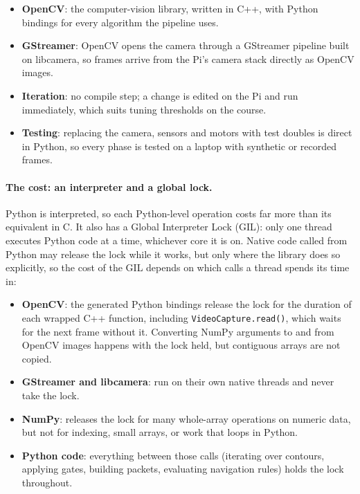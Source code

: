 \begin{itemize}
      \item \textbf{OpenCV}: the computer-vision library, written in C++, with
            Python bindings for every algorithm the pipeline uses.
      \item \textbf{GStreamer}: OpenCV opens the camera through a GStreamer
            pipeline built on libcamera, so frames arrive from the Pi's camera stack
            directly as OpenCV images.
      \item \textbf{Iteration}: no compile step; a change is edited on the Pi
            and run immediately, which suits tuning thresholds on the course.
      \item \textbf{Testing}: replacing the camera, sensors and motors with test
            doubles is direct in Python, so every phase is tested on a laptop with
            synthetic or recorded frames.
\end{itemize}

\paragraph{The cost: an interpreter and a global lock.}
Python is interpreted, so each Python-level operation costs far more than its
equivalent in C. It also has a Global Interpreter Lock (GIL): only one thread
executes Python code at a time, whichever core it is on. Native code called
from Python may release the lock while it works, but only where the library
does so explicitly, so the cost of the GIL depends on which calls a thread
spends its time in:

\begin{itemize}
      \item \textbf{OpenCV}: the generated Python bindings release the lock for
            the duration of each wrapped C++ function, including
            \texttt{VideoCapture.read()}, which waits for the next frame without
            it. Converting NumPy arguments to and from OpenCV images happens
            with the lock held, but contiguous arrays are not copied.
      \item \textbf{GStreamer and libcamera}: run on their own native threads
            and never take the lock.
      \item \textbf{NumPy}: releases the lock for many whole-array operations
            on numeric data, but not for indexing, small arrays, or work that
            loops in Python.
      \item \textbf{Python code}: everything between those calls (iterating
            over contours, applying gates, building packets, evaluating
            navigation rules) holds the lock throughout.
\end{itemize}

